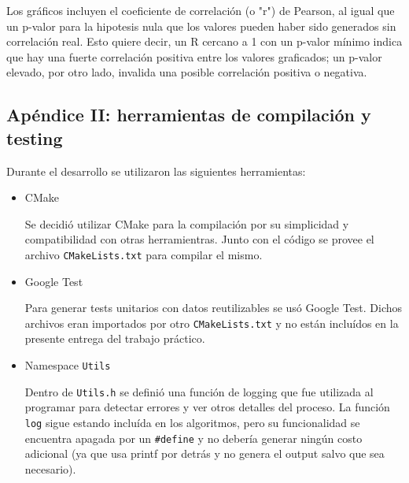 	Los gráficos incluyen el coeficiente de correlación (o "r") de Pearson, al igual que un p-valor para la hipotesis nula que los valores pueden haber sido generados sin correlación real. Esto quiere decir, un R cercano a 1 con un p-valor mínimo indica que hay una fuerte correlación positiva entre los valores graficados; un p-valor elevado, por otro lado, invalida una posible correlación positiva o negativa.

	\subsection{Apéndice II: herramientas de compilación y testing}
	Durante el desarrollo se utilizaron las siguientes herramientas:

	\begin{itemize}
		\item CMake

		Se decidió utilizar CMake para la compilación por su simplicidad y compatibilidad con otras herramientras. Junto con el código se provee el archivo \texttt{CMakeLists.txt} para compilar el mismo.

		\item Google Test

		Para generar tests unitarios con datos reutilizables se usó Google Test. Dichos archivos eran importados por otro \texttt{CMakeLists.txt} y no están incluídos en la presente entrega del trabajo práctico.

		\item Namespace \texttt{Utils}

		Dentro de \texttt{Utils.h} se definió una función de logging que fue utilizada al programar para detectar errores y ver otros detalles del proceso. La función \texttt{log} sigue estando incluída en los algoritmos, pero su funcionalidad se encuentra apagada por un \texttt{\#define} y no debería generar ningún costo adicional (ya que usa printf por detrás y no genera el output salvo que sea necesario).
	\end{itemize}